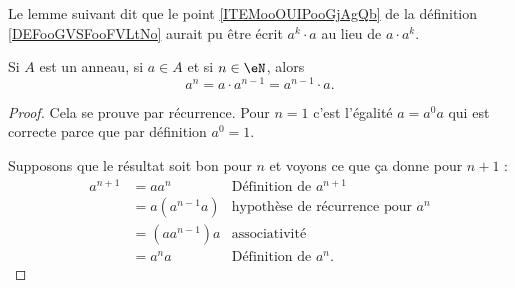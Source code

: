 Le lemme suivant dit que le point \ref{ITEMooOUIPooGjAgQb} de la définition \ref{DEFooGVSFooFVLtNo} aurait pu être écrit \( a^k\cdot a\) au lieu de \( a\cdot a^k\).
\begin{lemma}        \label{LEMooWPARooYLZlzr}
    Si \( A\) est un anneau, si \( a\in A\) et si \( n\in \eN\), alors
    \begin{equation}
        a^n=a\cdot a^{n-1}=a^{n-1}\cdot a.
    \end{equation}
\end{lemma}

\begin{proof}
    Cela se prouve par récurrence. Pour \( n=1\) c'est l'égalité \( a=a^0a\) qui est correcte parce que par définition \( a^0=1\).

    Supposons que le résultat soit bon pour \( n\) et voyons ce que ça donne pour \( n+1\) :
    \begin{subequations}
        \begin{align}
            a^{n+1}&=aa^n      &\text{Définition de } a^{n+1}     \\
            &=a(a^{n-1}a)       &\text{hypothèse de récurrence pour } a^n\\
            &=(aa^{n-1})a       &\text{associativité}\\
            &=a^na          &\text{Définition de } a^n.
        \end{align}
    \end{subequations}
\end{proof}
